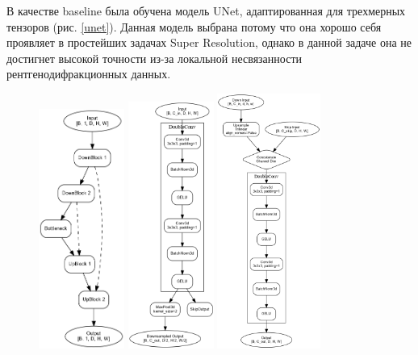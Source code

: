 \documentclass[a4paper,12pt]{article}
\begin{document}
{В качестве baseline была обучена модель UNet, адаптированная для трехмерных тензоров (рис. \ref{unet}). Данная модель выбрана потому что она хорошо себя проявляет в простейших задачах Super Resolution, однако в данной задаче она не достигнет высокой точности из-за локальной несвязанности рентгенодифракционных данных. 

\begin{figure}[H]
    \centering
    \includegraphics[width=0.25\textwidth]{mini_unet_architecture.png}
    \includegraphics[width=0.25\textwidth]{downblock_architecture.png}
    \includegraphics[width=0.3\textwidth]{upblock_architecture.png}

\end{figure}}
\end{document}

